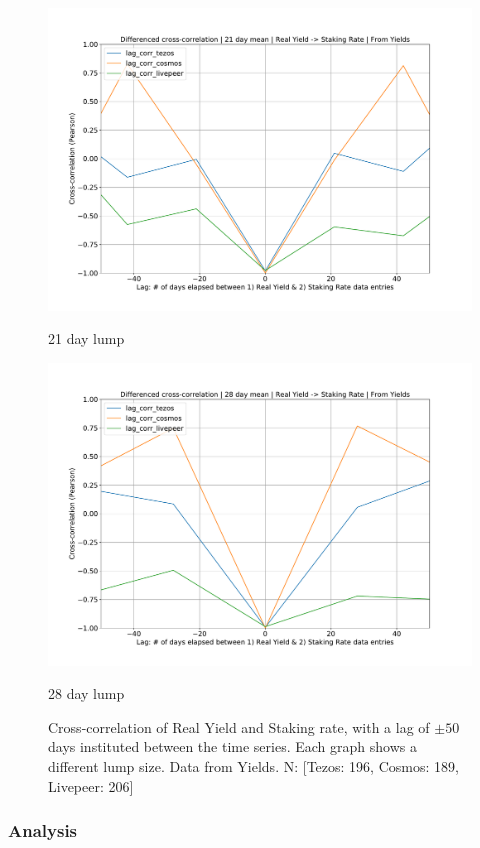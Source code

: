 \documentclass[longbibliography,nofootinbib]{revtex4-1}
\begin{document}
\begin{figure}
\begin{minipage}{0.5\textwidth}
        \includegraphics[width=1\textwidth]{graphs/CrossCorr_Yields_DIF_21.pdf}
        \caption{21 day lump}
    \end{minipage}\hfill
    \begin{minipage}{0.5\textwidth}
        \centering
        \includegraphics[width=1\textwidth]{graphs/CrossCorr_Yields_DIF_28.pdf}
        \caption{28 day lump}
    \end{minipage}
    \caption{Cross-correlation of Real Yield and Staking rate, with a lag of $\pm50$ days instituted between the time series. Each graph shows a different lump size. Data from Yields. N: [Tezos: 196, Cosmos: 189, Livepeer: 206]}
\end{figure}

\subsubsection{Analysis}
\end{document}
